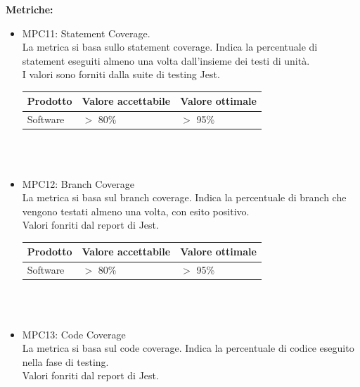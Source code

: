 \documentclass[12pt]{article}
\begin{document}
\textbf{Metriche:}
\begin{itemize}
	\item MPC11: Statement Coverage. \\
	      La metrica si basa sullo statement coverage.
	      Indica la percentuale di statement eseguiti almeno una volta dall'insieme dei testi di unità.\\
	      I valori sono forniti dalla suite di testing Jest.

	      \begin{center}
		      \begin{tabularx}{\textwidth}{|X|X|X|}
			      \hline
			      \textbf{Prodotto} & \textbf{Valore accettabile } & \textbf{Valore ottimale } \\
			      \hline
			      Software          & $>$ 80\%                     & $>$ 95\%                  \\
			      \hline
		      \end{tabularx}\\[8pt]
		      \mbox{}\\
	      \end{center}

	\item MPC12: Branch Coverage \\
	      La metrica si basa sul branch coverage. Indica la percentuale di branch che vengono testati almeno una volta, con esito positivo. \\
	      Valori fonriti dal report di Jest.

	      \begin{center}
		      \begin{tabularx}{\textwidth}{|X|X|X|}
			      \hline
			      \textbf{Prodotto} & \textbf{Valore accettabile } & \textbf{Valore ottimale } \\
			      \hline
			      Software          & $>$ 80\%                     & $>$ 95\%                  \\
			      \hline
		      \end{tabularx}\\[8pt]
		      \mbox{}\\
	      \end{center}

	\item MPC13: Code Coverage \\
	      La metrica si basa sul code coverage. Indica la percentuale di codice eseguito nella fase di testing. \\
	      Valori fonriti dal report di Jest.


\end{itemize}
\end{document}
